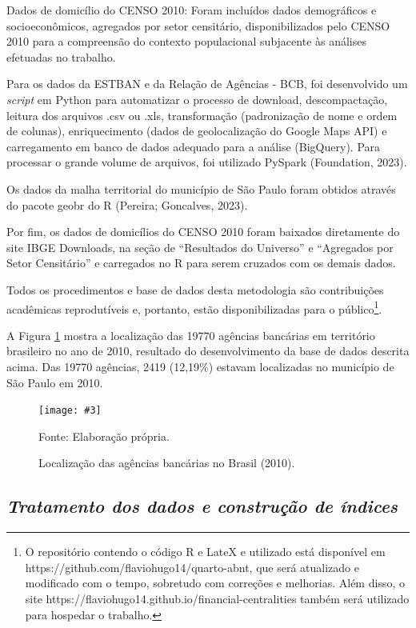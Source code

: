\documentclass[a4paper,12pt]{article}
\newcommand{\fig}[4]{%
  \begin{figure}[H]
    \centering
    \caption{#1}
    \label{#2}
    \texttt{[image: \#3]}
    
    \vspace{0.5cm}
    
    \begin{footnotesize}
      Fonte: #4
    \end{footnotesize}
  \end{figure}
}
\begin{document}
Dados de domicílio do CENSO 2010: Foram incluídos dados demográficos e
socioeconômicos, agregados por setor censitário, disponibilizados pelo
CENSO 2010 para a compreensão do contexto populacional subjacente às
análises efetuadas no trabalho.

Para os dados da ESTBAN e da Relação de Agências - BCB, foi desenvolvido
um \emph{script} em Python para automatizar o processo de download,
descompactação, leitura dos arquivos .csv ou .xls, transformação
(padronização de nome e ordem de colunas), enriquecimento (dados de
geolocalização do Google Maps API) e carregamento em banco de dados
adequado para a análise (BigQuery). Para processar o grande volume de
arquivos, foi utilizado PySpark (Foundation, 2023).

Os dados da malha territorial do município de São Paulo foram obtidos
através do pacote geobr do R (Pereira; Goncalves, 2023).

Por fim, os dados de domicílios do CENSO 2010 foram baixados diretamente
do site IBGE Downloads, na seção de ``Resultados do Universo'' e
``Agregados por Setor Censitário'' e carregados no R para serem cruzados
com os demais dados.

Todos os procedimentos e base de dados desta metodologia são
contribuições acadêmicas reprodutíveis e, portanto, estão
disponibilizadas para o público\footnote{O repositório contendo o código
  R e LateX e utilizado está disponível em
  https://github.com/flaviohugo14/quarto-abnt, que será atualizado e
  modificado com o tempo, sobretudo com correções e melhorias. Além
  disso, o site https://flaviohugo14.github.io/financial-centralities
  também será utilizado para hospedar o trabalho.}.

A Figura \ref{fig:brasil} mostra a localização das 19770 agências
bancárias em território brasileiro no ano de 2010, resultado do
desenvolvimento da base de dados descrita acima. Das 19770 agências,
2419 (12,19\%) estavam localizadas no município de São Paulo em 2010.

\fig{Localização das agências bancárias no Brasil (2010).}{fig:brasil}{images/brasil.png}{Elaboração própria.}

\hypertarget{tratamento-dos-dados-e-construuxe7uxe3o-de-uxedndices}{%
\subsection{\texorpdfstring{\emph{Tratamento dos dados e construção de
índices}}{Tratamento dos dados e construção de índices}}\label{tratamento-dos-dados-e-construuxe7uxe3o-de-uxedndices}}
\end{document}
